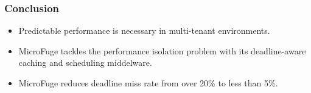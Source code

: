 \documentclass{beamer}
\begin{document}

\begin{frame}
  \frametitle{Conclusion}
  \begin{itemize}
  \item Predictable performance is necessary in multi-tenant environments.
  \item MicroFuge tackles the performance isolation problem with its
    deadline-aware caching and scheduling middelware.
  \item MicroFuge reduces deadline miss rate from over 20\% to
    less than 5\%.
  \end{itemize}
\end{frame}
\end{document}
